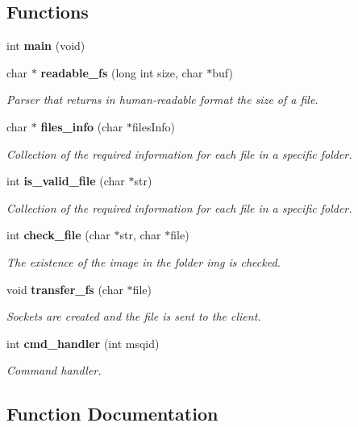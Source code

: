 \subsection*{Functions}
\begin{DoxyCompactItemize}
\item 
int \textbf{ main} (void)
\item 
char $\ast$ \textbf{ readable\+\_\+fs} (long int size, char $\ast$buf)
\begin{DoxyCompactList}\small\item\em Parser that returns in human-\/readable format the size of a file. \end{DoxyCompactList}\item 
char $\ast$ \textbf{ files\+\_\+info} (char $\ast$files\+Info)
\begin{DoxyCompactList}\small\item\em Collection of the required information for each file in a specific folder. \end{DoxyCompactList}\item 
int \textbf{ is\+\_\+valid\+\_\+file} (char $\ast$str)
\begin{DoxyCompactList}\small\item\em Collection of the required information for each file in a specific folder. \end{DoxyCompactList}\item 
int \textbf{ check\+\_\+file} (char $\ast$str, char $\ast$file)
\begin{DoxyCompactList}\small\item\em The existence of the image in the folder img is checked. \end{DoxyCompactList}\item 
void \textbf{ transfer\+\_\+fs} (char $\ast$file)
\begin{DoxyCompactList}\small\item\em Sockets are created and the file is sent to the client. \end{DoxyCompactList}\item 
int \textbf{ cmd\+\_\+handler} (int msqid)
\begin{DoxyCompactList}\small\item\em Command handler. \end{DoxyCompactList}\end{DoxyCompactItemize}


\subsection{Function Documentation}
\mbox{\label{fileserv_8c_a934e48b50634987f1069e535f4f9753a}} 
